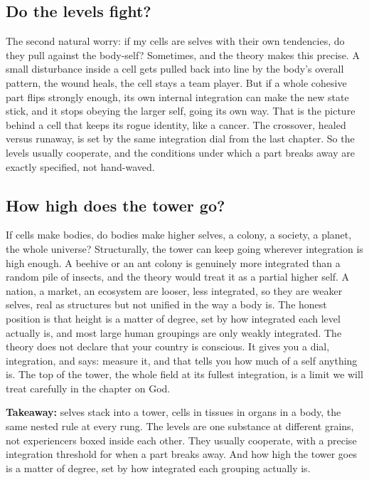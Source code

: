 \subsection{Do the levels fight?}

The second natural worry: if my cells are selves with their own tendencies, do they pull against the body-self? Sometimes, and the theory makes this precise. A small disturbance inside a cell gets pulled back into line by the body's overall pattern, the wound heals, the cell stays a team player. But if a whole cohesive part flips strongly enough, its own internal integration can make the new state stick, and it stops obeying the larger self, going its own way. That is the picture behind a cell that keeps its rogue identity, like a cancer. The crossover, healed versus runaway, is set by the same integration dial from the last chapter. So the levels usually cooperate, and the conditions under which a part breaks away are exactly specified, not hand-waved.

\subsection{How high does the tower go?}

If cells make bodies, do bodies make higher selves, a colony, a society, a planet, the whole universe? Structurally, the tower can keep going wherever integration is high enough. A beehive or an ant colony is genuinely more integrated than a random pile of insects, and the theory would treat it as a partial higher self. A nation, a market, an ecosystem are looser, less integrated, so they are weaker selves, real as structures but not unified in the way a body is. The honest position is that height is a matter of degree, set by how integrated each level actually is, and most large human groupings are only weakly integrated. The theory does not declare that your country is conscious. It gives you a dial, integration, and says: measure it, and that tells you how much of a self anything is. The top of the tower, the whole field at its fullest integration, is a limit we will treat carefully in the chapter on God.

\textbf{Takeaway:} selves stack into a tower, cells in tissues in organs in a body, the same nested rule at every rung. The levels are one substance at different grains, not experiencers boxed inside each other. They usually cooperate, with a precise integration threshold for when a part breaks away. And how high the tower goes is a matter of degree, set by how integrated each grouping actually is.
